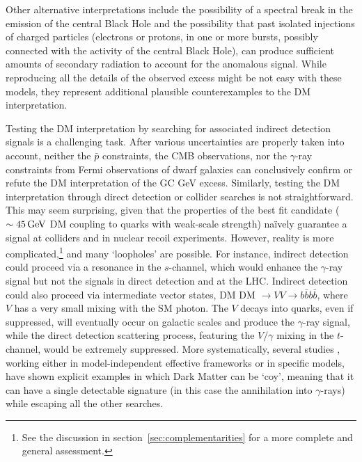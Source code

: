 Other alternative interpretations include the possibility of a spectral break in the emission of the central Black Hole and the possibility that past isolated injections of charged particles (electrons or protons, in one or more bursts, possibly connected with the activity of the central Black Hole), can produce sufficient amounts of secondary radiation to account for the anomalous signal. 
While reproducing all the details of the observed excess might be not easy with these models, they represent additional plausible counterexamples to the DM interpretation.



\medskip

Testing the DM interpretation by searching for associated indirect detection signals is a challenging task. After various uncertainties are properly taken into account, neither the $\bar p$ constraints, the CMB observations, nor the $\gamma$-ray constraints from {\sc Fermi} observations of dwarf galaxies can conclusively confirm or refute the DM interpretation of the GC GeV excess. 
Similarly, testing the DM interpretation through direct detection or collider searches is not straightforward. This may seem surprising, given that the properties of the best fit candidate ($\sim 45\,{\rm GeV}$ DM coupling to quarks with weak-scale strength) na\"ively guarantee a signal at colliders and in nuclear recoil experiments. However, reality is more complicated,\footnote{See the discussion in section~\ref{sec:complementarities} for a more complete and general assessment.} and many `loopholes' are possible. For instance, indirect detection could proceed via a resonance in the $s$-channel, which would enhance the $\gamma$-ray signal but not the signals in direct detection and at the LHC. 
Indirect detection could also proceed via intermediate vector states, DM DM $\to VV \to b \bar b b \bar b$, 
where $V$ has a very small mixing with the SM photon. The $V$ decays into quarks, even if suppressed, will eventually occur on galactic scales and produce the $\gamma$-ray signal, while the direct detection scattering process, featuring the $V/\gamma$ mixing in the $t$-channel, would be extremely suppressed.
More systematically, several studies \cite{CoyDM}, working either in model-independent effective frameworks or in specific models,  have shown explicit examples in which Dark Matter can be `coy', meaning that it can have a single detectable signature (in this case the annihilation into $\gamma$-rays) while escaping all the other searches.


\medskip

